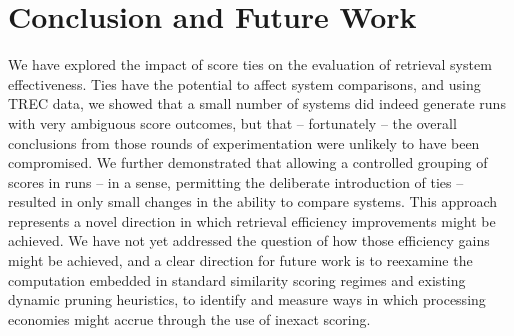 \section{Conclusion and Future Work}
\label{sec-conclusion}

We have explored the impact of score ties on the evaluation of
retrieval system effectiveness.
Ties have the potential to affect system comparisons, and using TREC
data, we showed that a small number of systems did indeed generate
runs with very ambiguous score outcomes, but that -- fortunately --
the overall conclusions from those rounds of experimentation were
unlikely to have been compromised.
We further demonstrated that allowing a controlled grouping of scores
in runs -- in a sense, permitting the deliberate introduction of ties
-- resulted in only small changes in the ability to compare systems.
This approach represents a novel direction in which retrieval
efficiency improvements might be achieved.
We have not yet addressed the question of how those efficiency gains
might be achieved, and a clear direction for future work is to
reexamine the computation embedded in standard similarity scoring
regimes and existing dynamic pruning heuristics, to identify and
measure ways in which processing economies might accrue through the
use of inexact scoring.


